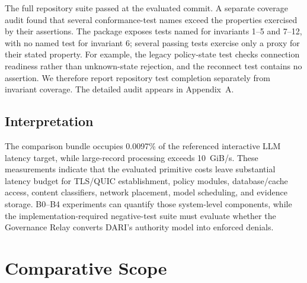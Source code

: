 \documentclass[10pt]{article}
\begin{document}
The full repository suite passed at the evaluated commit. A separate coverage audit found that several conformance-test names exceed the properties exercised by their assertions. The package exposes tests named for invariants 1--5 and 7--12, with no named test for invariant 6; several passing tests exercise only a proxy for their stated property. For example, the legacy policy-state test checks connection readiness rather than unknown-state rejection, and the reconnect test contains no assertion. We therefore report repository test completion separately from invariant coverage. The detailed audit appears in Appendix~A.

\subsection{Interpretation}

The comparison bundle occupies 0.0097\% of the referenced interactive LLM latency target, while large-record processing exceeds 10~GiB/s. These measurements indicate that the evaluated primitive costs leave substantial latency budget for TLS/QUIC establishment, policy modules, database/cache access, content classifiers, network placement, model scheduling, and evidence storage. B0--B4 experiments can quantify those system-level components, while the implementation-required negative-test suite must evaluate whether the Governance Relay converts DARI's authority model into enforced denials.

\section{Comparative Scope}
\end{document}
